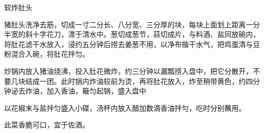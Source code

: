 \begin{recipe}{软炸肚头}

\ingredients


\cooking

\step 猪肚头洗净去筋，切成一寸二分长、八分宽、三分厚的块，每块上面划上距离一分半宽的斜十字花刀，漂于清水中。葱切成葱节，蒜切成片，与料酒、盐同放碗内，将肚花滤干水放入，浸约五分钟后捞去姜葱不用，以净布揩干水气，把鸡蛋清与豆粉混合入碗，将肚花拌匀。

\step 炒锅内放入猪油烧沸，投入肚花微炸，约三分钟以漏瓢捞入盘中，把它分散开，不要几块结成一团。此时锅内炸油较前为烫，再将肚花放入，炸至稍带黄色，约四分钟泌去炸油，加入香油，簸匀起锅，盛入盘中

\step 以花椒末与盐拌匀盛入小碟，汤杯内放入醋加数滴香油拌勻，吃时分别蘸用。

\notes

此菜香脆可口，宜于佐酒。

\end{recipe}

